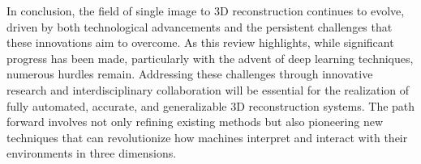 \documentclass[conference]{IEEEtran}
\begin{document}
In conclusion, the field of single image to 3D reconstruction continues to evolve, driven by both technological advancements and the persistent challenges that these innovations aim to overcome. As this review highlights, while significant progress has been made, particularly with the advent of deep learning techniques, numerous hurdles remain. Addressing these challenges through innovative research and interdisciplinary collaboration will be essential for the realization of fully automated, accurate, and generalizable 3D reconstruction systems. The path forward involves not only refining existing methods but also pioneering new techniques that can revolutionize how machines interpret and interact with their environments in three dimensions.

            
            

            
\end{document}
